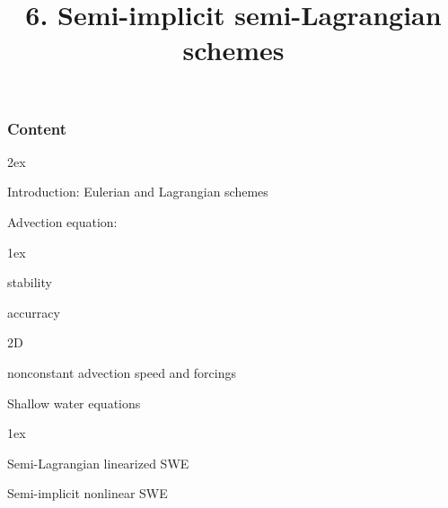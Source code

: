 \documentclass[aspectratio=149,9pt]{beamer}
\title{6. Semi-implicit semi-Lagrangian schemes}%
\begin{document}
%
%
\begin{frame}[plain]
	\titlepage
\end{frame}
%
%
\begin{frame}
	\frametitle{Content}
	\begin{myitemize}{2ex}
		\item Introduction: Eulerian and Lagrangian schemes
		\item Advection equation:
			\begin{myitemize}{1ex}
				\item stability
				\item accurracy
				\item 2D
				\item nonconstant advection speed and forcings
			\end{myitemize}
		\item Shallow water equations
			\begin{myitemize}{1ex}
				\item Semi-Lagrangian linearized SWE
				\item Semi-implicit nonlinear SWE
			\end{myitemize}
	\end{myitemize}
\end{frame}
%
%
\end{document}
